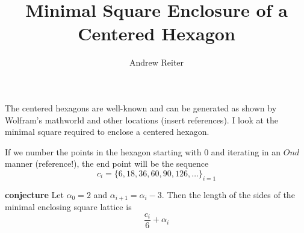 \documentclass[11pt]{amsart}
\title{Minimal Square Enclosure of a Centered Hexagon}
\author{Andrew Reiter}
\begin{document}
\maketitle
\section{}
The centered hexagons are well-known and can be generated as shown by 
Wolfram's mathworld and other locations (insert references). I look at the minimal
square required to enclose a centered hexagon.

If we number the points in the hexagon starting with 0 and iterating in an $Ond$ 
manner (reference!), the end point will be the sequence
\[
c_i = \{ 6, 18, 36, 60, 90, 126, \ldots \}_{i=1}
\]

\textbf{conjecture}
Let $\alpha_0 = 2$ and $\alpha_{i+1} = \alpha_{i} - 3$. Then the length of the sides
of the minimal enclosing square lattice is
\[
\frac{c_i}{6} + \alpha_{i}
\]

\end{document}

